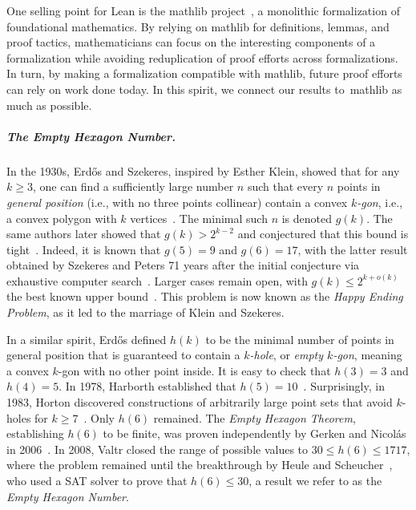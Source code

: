 One selling point for Lean is the \textsf{mathlib} project~\cite{The_mathlib_Community_2020},
a monolithic formalization of foundational mathematics.
By relying on \textsf{mathlib} for definitions, lemmas, and proof tactics,
mathematicians can focus on the interesting components of a formalization
while avoiding reduplication of proof efforts across formalizations.
In turn, by making a formalization compatible with \textsf{mathlib},
future proof efforts can rely on work done today.
In this spirit, we connect our results to~\textsf{mathlib} as much as possible.

\subparagraph*{The Empty Hexagon Number.}
In the 1930s,
Erd\H{o}s and Szekeres, inspired by Esther Klein, showed that for any $k \geq 3$,
one can find a sufficiently large number $n$
such that every $n$ points in \emph{general position}
(i.e., with no three points collinear)
contain a convex \emph{$k$-gon}, i.e., a convex polygon with $k$ vertices~\cite{35erdos_combinatorial_problem_geometry}.
The minimal such $n$ is denoted $g(k)$.
The same authors later showed that $g(k) > 2^{k-2}$
and conjectured that this bound is tight~\cite{60erdos_some_extremum_problems_elementary_geometry}.
Indeed, it is known that $g(5) = 9$ and $g(6) = 17$,
with the latter result obtained by Szekeres and Peters 71 years after the initial conjecture
via exhaustive computer search~\cite{06szekeres_computer_solution_17_point_erdos_szekeres_problem}.
Larger cases remain open,
with $g(k) \leq 2^{k+o(k)}$ the best known upper bound~\cite{suk2017erdos,holmsen2017two}.
This problem is now known as the \emph{Happy Ending Problem},
as it led to the marriage of Klein and Szekeres.

In a similar spirit,
Erd\H{o}s defined $h(k)$
to be the minimal number of points in general position
that is guaranteed to contain a \emph{$k$-hole},
or \emph{empty $k$-gon},
meaning a convex $k$-gon with no other point inside.
It is easy to check that $h(3) = 3$ and $h(4) = 5$.
In 1978, Harborth established that $h(5) = 10$~\cite{Harborth1978}.
Surprisingly, in 1983, Horton discovered constructions of arbitrarily large point sets that 
avoid $k$-holes for $k \geq 7$~\cite{hortonSetsNoEmpty1983}.
Only $h (6)$ remained.
The \emph{Empty Hexagon Theorem},
establishing $h(6)$ to be finite,
was proven independently by Gerken and Nicolás in 2006~\cite{gerkenEmptyConvexHexagons2008,nicolasEmptyHexagonTheorem2007}.
In 2008, Valtr closed the range of possible values to $30 \leq h(6) \leq 1717$,
where the problem remained until the breakthrough by Heule and Scheucher~\cite{emptyHexagonNumber},
who used a SAT solver to prove that $h(6) \leq 30$,
a result we refer to as the \emph{Empty Hexagon Number}.
